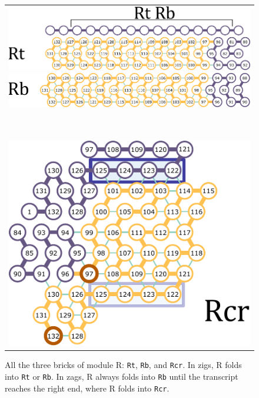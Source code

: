 \documentclass[runningheads]{llncs}
\begin{document}
\begin{figure}[tb]
\begin{tabular}{c}
 \begin{minipage}{0.5\linewidth}
  \centering
   \includegraphics[width=0.8\linewidth]{fig/svg/Rt_1.pdf}
 \end{minipage}
 
 \begin{minipage}{0.5\linewidth}
  \centering
   \includegraphics[width=0.8\linewidth]{fig/svg/Rb_1.pdf}

 \end{minipage}

\vspace{10mm}

\ \\
  \raggedright
   \includegraphics[width=0.3\linewidth]{fig/svg/Rtr_1.pdf}

 \end{tabular}
 \caption{All the three bricks of module R: \texttt{Rt}, \texttt{Rb}, and \texttt{Rcr}.
 In zigs, R folds into \texttt{Rt} or \texttt{Rb}.
 In zags, R always folds into \texttt{Rb} until the transcript reaches the right end, where R folds into \texttt{Rcr}.}
 \label{fig:rightturns}
\end{figure}
\end{document}
